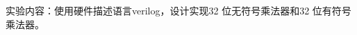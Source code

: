 \documentclass{tongji-comporg-report}
\begin{document}
\MakeReportCover

\begin{ReportBody}

实验内容：使用硬件描述语言verilog，设计实现32 位无符号乘法器和32 位有符号乘法器。

\ReportSectionGap


\ReportSectionGap


\ReportSectionGap


\ReportBigGap[1.65cm]


\ReportBigGap[3.55cm]


\end{ReportBody}
\end{document}

